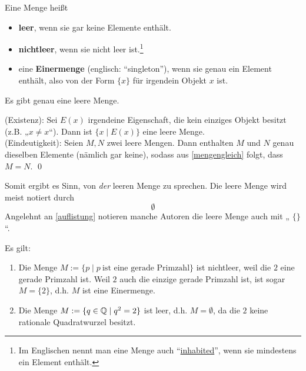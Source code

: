 \begin{defin}  
    Eine Menge heißt
    \begin{itemize}
        \item \textbf{leer}, wenn sie gar keine Elemente enthält.
        \item \textbf{nichtleer}, wenn sie nicht leer ist.\footnote{Im Englischen nennt man eine Menge auch ``\href{https://en.wikipedia.org/wiki/Inhabited_set}{inhabited}'', wenn sie mindestens ein Element enthält.}
        \item eine \textbf{Einermenge} (englisch: ``singleton''), wenn sie genau ein Element enthält, also von der Form $\{x\}$ für irgendein Objekt $x$ ist.
    \end{itemize}
\end{defin}


\begin{satz} \label{leeremengeeind}
    Es gibt genau eine leere Menge.
\end{satz}


\begin{bew}
    (Existenz): Sei $E(x)$ irgendeine Eigenschaft, die kein einziges Objekt besitzt (z.B. „$x\neq x$“). Dann ist $\{ x\mid E(x) \}$ eine leere Menge. \\[0.5em]
    (Eindeutigkeit): Seien $M,N$ zwei leere Mengen. Dann enthalten $M$ und $N$ genau dieselben Elemente (nämlich gar keine), sodass aus \cref{mengengleich} folgt, dass $M=N$. \qed
\end{bew}


\begin{nota}
    Somit ergibt es Sinn, von \emph{der} leeren Menge zu sprechen. Die leere Menge wird meist notiert durch
        \[ \emptyset \]
    Angelehnt an \cref{auflistung} notieren manche Autoren die leere Menge auch mit „ $\{\}$ “.
\end{nota}


\begin{bsp}
    Es gilt:
    \begin{enumerate}
        \item Die Menge $M:=\{p\mid p\ \text{ist eine gerade Primzahl}\}$ ist nichtleer, weil die $2$ eine gerade Primzahl ist. Weil $2$ auch die einzige gerade Primzahl ist, ist sogar $M=\{2\}$, d.h. $M$ ist eine Einermenge.
        \item Die Menge $M:= \{ q\in \mathbb Q\mid q^2=2\}$ ist leer, d.h. $M=\emptyset$, da die $2$ keine rationale Quadratwurzel besitzt.
    \end{enumerate}
\end{bsp}


